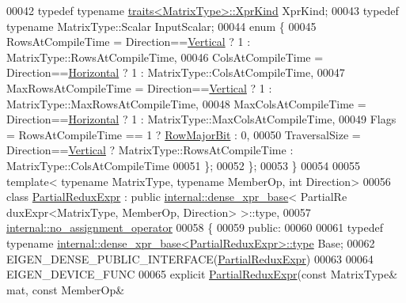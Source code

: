 \begin{DoxyCode}
00042   \textcolor{keyword}{typedef} \textcolor{keyword}{typename} \hyperlink{struct_eigen_1_1internal_1_1traits}{traits<MatrixType>::XprKind} XprKind;
00043   \textcolor{keyword}{typedef} \textcolor{keyword}{typename} MatrixType::Scalar InputScalar;
00044   \textcolor{keyword}{enum} \{
00045     RowsAtCompileTime = Direction==\hyperlink{group__enums_ggad49a7b3738e273eb00932271b36127f7addca718e0564723df21d61b94b1198be}{Vertical}   ? 1 : MatrixType::RowsAtCompileTime,
00046     ColsAtCompileTime = Direction==\hyperlink{group__enums_ggad49a7b3738e273eb00932271b36127f7aae8a16b3b9272683c1162915f6d892be}{Horizontal} ? 1 : MatrixType::ColsAtCompileTime,
00047     MaxRowsAtCompileTime = Direction==\hyperlink{group__enums_ggad49a7b3738e273eb00932271b36127f7addca718e0564723df21d61b94b1198be}{Vertical}   ? 1 : MatrixType::MaxRowsAtCompileTime,
00048     MaxColsAtCompileTime = Direction==\hyperlink{group__enums_ggad49a7b3738e273eb00932271b36127f7aae8a16b3b9272683c1162915f6d892be}{Horizontal} ? 1 : MatrixType::MaxColsAtCompileTime,
00049     Flags = RowsAtCompileTime == 1 ? \hyperlink{group__flags_gae4f56c2a60bbe4bd2e44c5b19cbe8762}{RowMajorBit} : 0,
00050     TraversalSize = Direction==\hyperlink{group__enums_ggad49a7b3738e273eb00932271b36127f7addca718e0564723df21d61b94b1198be}{Vertical} ? MatrixType::RowsAtCompileTime :  
      MatrixType::ColsAtCompileTime
00051   \};
00052 \};
00053 \}
00054 
00055 \textcolor{keyword}{template}< \textcolor{keyword}{typename} MatrixType, \textcolor{keyword}{typename} MemberOp, \textcolor{keywordtype}{int} Direction>
00056 \textcolor{keyword}{class }\hyperlink{group___core___module_class_eigen_1_1_partial_redux_expr}{PartialReduxExpr} : \textcolor{keyword}{public} \hyperlink{struct_eigen_1_1internal_1_1dense__xpr__base}{internal::dense\_xpr\_base}< PartialRe
      duxExpr<MatrixType, MemberOp, Direction> >::type,
00057                          \hyperlink{class_eigen_1_1internal_1_1no__assignment__operator}{internal::no\_assignment\_operator}
00058 \{
00059   \textcolor{keyword}{public}:
00060 
00061     \textcolor{keyword}{typedef} \textcolor{keyword}{typename} \hyperlink{struct_eigen_1_1internal_1_1dense__xpr__base}{internal::dense\_xpr\_base<PartialReduxExpr>::type}
       Base;
00062     EIGEN\_DENSE\_PUBLIC\_INTERFACE(\hyperlink{group___core___module_class_eigen_1_1_partial_redux_expr}{PartialReduxExpr})
00063 
00064     EIGEN\_DEVICE\_FUNC
00065     \textcolor{keyword}{explicit} \hyperlink{group___core___module_class_eigen_1_1_partial_redux_expr}{PartialReduxExpr}(\textcolor{keyword}{const} MatrixType& mat, \textcolor{keyword}{const} MemberOp& 

\end{DoxyCode}
